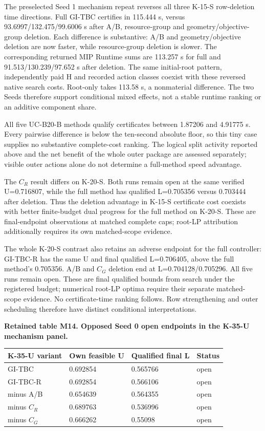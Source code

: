 \documentclass[
  american,
  11pt,
]{article}
\newcounter{none} %
\begin{document}
The preselected Seed 1 mechanism repeat reverses all three K-15-S
row-deletion time directions. Full GI-TBC certifies in 115.444 s, versus
93.6997/132.475/99.6006 s after A/B, resource-group and
geometry/objective-group deletion. Each difference is substantive: A/B
and geometry/objective deletion are now faster, while resource-group
deletion is slower. The corresponding returned MIP Runtime sums are
113.257 s for full and 91.513/130.239/97.652 s after deletion. The same
initial-root pattern, independently paid H and recorded action classes
coexist with these reversed native search costs. Root-only takes 113.58
s, a nonmaterial difference. The two Seeds therefore support conditional
mixed effects, not a stable runtime ranking or an additive component
share.

All five UC-B20-B methods qualify certificates between 1.87206 and
4.91775 s. Every pairwise difference is below the ten-second absolute
floor, so this tiny case supplies no substantive complete-cost ranking.
The logical split activity reported above and the net benefit of the
whole outer package are assessed separately; visible outer actions alone
do not determine a full-method speed advantage.

The \(C_R\) result differs on K-20-S. Both runs remain open at the same
verified U=0.716807, while the full method has qualified L=0.705356
versus 0.703444 after deletion. Thus the deletion advantage in K-15-S
certificate cost coexists with better finite-budget dual progress for
the full method on K-20-S. These are final-endpoint observations at
matched complete caps; root-LP attribution additionally requires its own
matched-scope evidence.

The whole K-20-S contrast also retains an adverse endpoint for the full
controller: GI-TBC-R has the same U and final qualified L=0.706405,
above the full method's 0.705356. A/B and \(C_G\) deletion end at
L=0.704128/0.705296. All five runs remain open. These are final
qualified bounds from search under the registered budget; numerical
root-LP optima require their separate matched-scope evidence. No
certificate-time ranking follows. Row strengthening and outer scheduling
therefore have distinct conditional interpretations.

\Needspace{204pt}

\textbf{Retained table M14. Opposed Seed 0 open endpoints in the K-35-U
mechanism panel.}

{\def\LTcaptype{none} %
\begin{longtable}[]{@{}llll@{}}
\toprule\noalign{}
K-35-U variant & Own feasible U & Qualified final L & Status \\
\midrule\noalign{}
\endhead
\bottomrule\noalign{}
\endlastfoot
GI-TBC & 0.692854 & 0.565766 & open \\
GI-TBC-R & 0.692854 & 0.566106 & open \\
minus A/B & 0.654639 & 0.564355 & open \\
minus \(C_R\) & 0.689763 & 0.536996 & open \\
minus \(C_G\) & 0.666262 & 0.55098 & open \\
\end{longtable}
}
\end{document}
